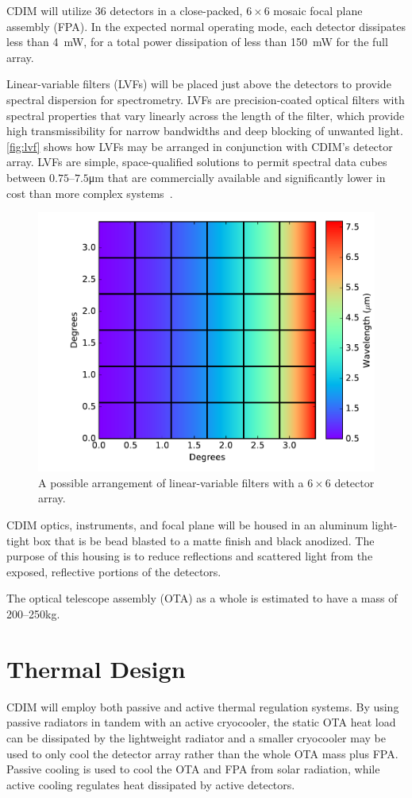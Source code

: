 \documentclass{ws-jai}
\begin{document}
CDIM will utilize 36 detectors in a close-packed, $6\times6$ mosaic focal plane assembly (FPA).
In the expected normal operating mode, each detector dissipates less than \SI{4}{\milli\watt}, for a total power dissipation of less than \SI{150}{\milli\watt} for the full array.

Linear-variable filters (LVFs) will be placed just above the detectors to provide spectral dispersion for spectrometry.
LVFs are precision-coated optical filters with spectral properties that vary linearly across the length of the filter, which provide high transmissibility for narrow bandwidths and deep blocking of unwanted light.
\autoref{fig:lvf} shows how LVFs may be arranged in conjunction with CDIM's detector array.
LVFs are simple, space-qualified solutions to permit spectral data cubes between $0.75$--$7.5$\si{\micro\meter} that are commercially available and significantly lower in cost than more complex systems~\cite{photonicsdotcom2016lvf}.
\begin{figure}
  \centering
  \includegraphics[width=.5\linewidth]{figs/lvf_positioning.pdf}
  \caption{A possible arrangement of linear-variable filters with a $6\times6$ detector array.}
\label{fig:lvf}
\end{figure}

CDIM optics, instruments, and focal plane will be housed in an aluminum light-tight box that is be bead blasted to a matte finish and black anodized.
The purpose of this housing is to reduce reflections and scattered light from the exposed, reflective portions of the detectors.

The optical telescope assembly (OTA) as a whole is estimated to have a mass of 200--250\si{\kilo\gram}.

\section{Thermal Design}
\label{sec:thermal}
CDIM will employ both passive and active thermal regulation systems.
By using passive radiators in tandem with an active cryocooler, the static OTA heat load can be dissipated by the lightweight radiator and a smaller cryocooler may be used to only cool the detector array rather than the whole OTA mass plus FPA.\@
Passive cooling is used to cool the OTA and FPA from solar radiation, while active cooling regulates heat dissipated by active detectors.
\end{document}
